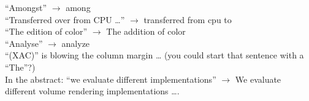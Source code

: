 \documentclass[]{article}
\begin{document}
“Amongst” $\rightarrow$ among\\

“Transferred over from CPU …” $\rightarrow$ transferred from cpu to\\ 

“The edition of color” $\rightarrow$ The addition of color\\

“Analyse” $\rightarrow$ analyze\\

“(XAC)” is blowing the column margin … (you could start that sentence with a “The”?)\\

In the abstract: “we evaluate different implementations” $\rightarrow$ We evaluate different volume rendering implementations ….\\
\end{document}
